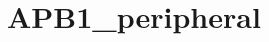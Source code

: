 \hypertarget{group___a_p_b1__peripheral}{\section{A\-P\-B1\-\_\-peripheral}
\label{group___a_p_b1__peripheral}
}
